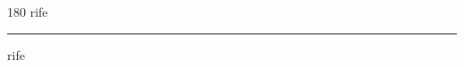 
\begin{frame}
\begin{center}
\begin{turn}{180}
{\fontsize{2.5cm}{1em}\selectfont rife}
\end{turn}
\vspace{1em}\par  
\hrule
\vspace{1em}\par  
{\fontsize{2.5cm}{1em}\selectfont rife}
\end{center}
\end{frame}

